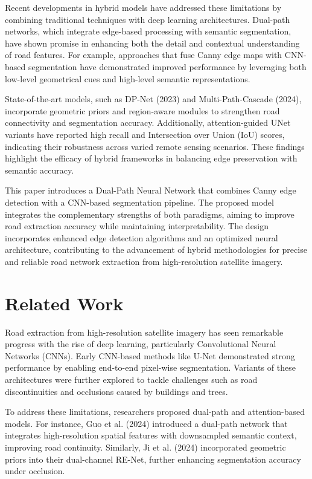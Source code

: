 \documentclass[conference]{IEEEtran}
\begin{document}
Recent developments in hybrid models have addressed these limitations by combining traditional techniques with deep learning architectures. Dual-path networks, which integrate edge-based processing with semantic segmentation, have shown promise in enhancing both the detail and contextual understanding of road features. For example, approaches that fuse Canny edge maps with CNN-based segmentation have demonstrated improved performance by leveraging both low-level geometrical cues and high-level semantic representations.

State-of-the-art models, such as DP-Net (2023) and Multi-Path-Cascade (2024), incorporate geometric priors and region-aware modules to strengthen road connectivity and segmentation accuracy. Additionally, attention-guided UNet variants have reported high recall and Intersection over Union (IoU) scores, indicating their robustness across varied remote sensing scenarios. These findings highlight the efficacy of hybrid frameworks in balancing edge preservation with semantic accuracy.

This paper introduces a Dual-Path Neural Network that combines Canny edge detection with a CNN-based segmentation pipeline. The proposed model integrates the complementary strengths of both paradigms, aiming to improve road extraction accuracy while maintaining interpretability. The design incorporates enhanced edge detection algorithms and an optimized neural architecture, contributing to the advancement of hybrid methodologies for precise and reliable road network extraction from high-resolution satellite imagery.

\section{Related Work}
Road extraction from high-resolution satellite imagery has seen remarkable progress with the rise of deep learning, particularly Convolutional Neural Networks (CNNs). Early CNN-based methods like U-Net demonstrated strong performance by enabling end-to-end pixel-wise segmentation. Variants of these architectures were further explored to tackle challenges such as road discontinuities and occlusions caused by buildings and trees.

To address these limitations, researchers proposed dual-path and attention-based models. For instance, Guo et al. (2024) introduced a dual-path network that integrates high-resolution spatial features with downsampled semantic context, improving road continuity. Similarly, Ji et al. (2024) incorporated geometric priors into their dual-channel RE-Net, further enhancing segmentation accuracy under occlusion.
\end{document}
